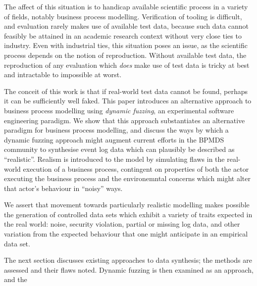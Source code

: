 \documentclass[12pt,draft]{article}
\begin{document}
The affect of this situation is to handicap available scientific process in a
variety of fields, notably business process modelling. Verification of tooling
is difficult, and evaluation rarely makes use of available test data, because
such data cannot feasibly be attained in an academic research context without
very close ties to industry. Even with industrial ties, this situation poses an
issue, as the scientific process depends on the notion of reproduction.
Without available test data, the reproduction of any evaluation which
\emph{does} make use of test data is tricky at best and intractable to
impossible at worst.
\par

The conceit of this work is that if real-world test data cannot be found,
perhaps it can be sufficiently well faked. This paper introduces an alternative
approach to business process modelling using \emph{dynamic fuzzing}, an
experimental software engineering paradigm. We show that this approach
substantiates an alternative paradigm for business process modelling, and
discuss the ways by which a dynamic fuzzing approach might augment current
efforts in the BPMDS community to synthesise event log data which can plausibly
be described as ``realistic''. Realism is introduced to the model by simulating
flaws in the real-world execution of a business process, contingent on
properties of both the actor executing the business process and the
environemntal concerns which might alter that actor's behaviour in ``noisy''
ways.
\par

We assert that movement towards particularly realistic modelling makes possible
the generation of controlled data sets which exhibit a variety of traits
expected in the real world: noise, security violation, partial or missing log
data, and other variation from the expected behaviour that one might anticipate
in an empirical data set.
\par

The next section discusses existing approaches to data synthesis; the methods
are assessed and their flaws noted. Dynamic fuzzing is then examined as an
approach, and the 
\end{document}
